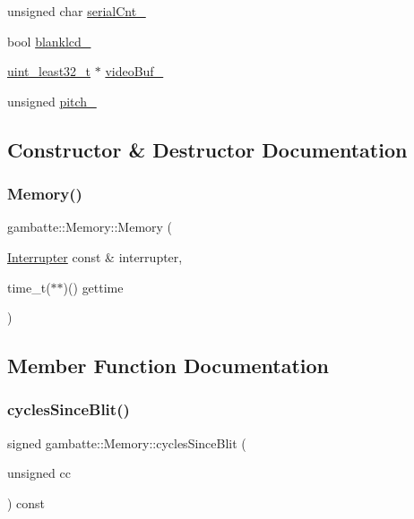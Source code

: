 \begin{DoxyCompactItemize}
\item 
unsigned char \hyperlink{classgambatte_1_1Memory_a88f5d13d739933a784542ca2e2384325}{serial\+Cnt\+\_\+}
\item 
bool \hyperlink{classgambatte_1_1Memory_a262c777f0c265696d155cc346e690089}{blanklcd\+\_\+}
\item 
\hyperlink{namespacegambatte_a0639f09fccfbbd5a8e0796318768e370}{uint\+\_\+least32\+\_\+t} $\ast$ \hyperlink{classgambatte_1_1Memory_a30ce39b7ad34c1d657704d59693897f2}{video\+Buf\+\_\+}
\item 
unsigned \hyperlink{classgambatte_1_1Memory_a293624b0105771a423bf01158d54db33}{pitch\+\_\+}
\end{DoxyCompactItemize}


\subsection{Constructor \& Destructor Documentation}
\mbox{\label{classgambatte_1_1Memory_a9945124a92611e7868bbd52418a3e40c}} 
\subsubsection{\texorpdfstring{Memory()}{Memory()}}
{\footnotesize\ttfamily gambatte\+::\+Memory\+::\+Memory (\begin{DoxyParamCaption}\item[{\hyperlink{classgambatte_1_1Interrupter}{Interrupter} const \&}]{interrupter,  }\item[{time\+\_\+t($\ast$$\ast$)()}]{gettime }\end{DoxyParamCaption})\hspace{0.3cm}{\ttfamily [explicit]}}



\subsection{Member Function Documentation}
\mbox{\label{classgambatte_1_1Memory_a8cdf9d89d7c6fd3acba8ba0e83b09044}} 
\subsubsection{\texorpdfstring{cycles\+Since\+Blit()}{cyclesSinceBlit()}}
{\footnotesize\ttfamily signed gambatte\+::\+Memory\+::cycles\+Since\+Blit (\begin{DoxyParamCaption}\item[{unsigned}]{cc }\end{DoxyParamCaption}) const\hspace{0.3cm}{\ttfamily [inline]}}

